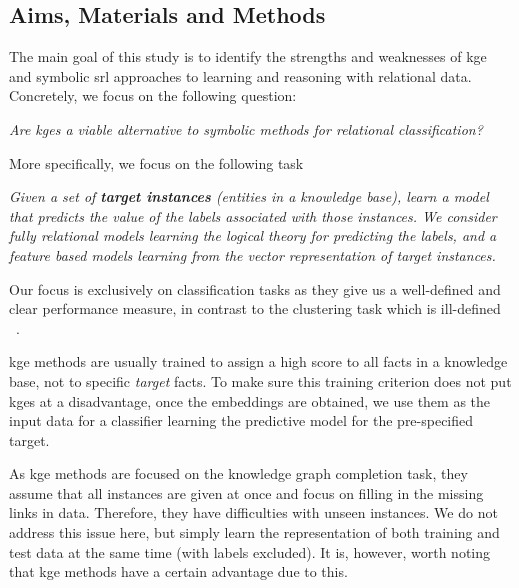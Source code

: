 \subsection{Aims, Materials and Methods}

The main goal of this study is to identify the strengths and weaknesses of  \gls{kge} and symbolic \gls{srl} approaches to learning and reasoning with relational data.
Concretely, we focus on the following question:

\begin{displayquote}
\textit{Are \gls{kge}s a viable alternative to symbolic methods for relational classification?}
\end{displayquote}


\noindent More specifically, we focus on the following task

\begin{displayquote}
\textit{Given a set of \textbf{target instances} (entities in a knowledge base), learn a model that predicts the value of the labels associated with those instances. We consider fully relational models learning the logical theory for predicting the labels, and a feature based models learning from the vector representation of target instances.}
\end{displayquote}


Our focus is exclusively on classification tasks as they give us a well-defined and clear performance measure, in contrast to the clustering task which is ill-defined ~\cite{Estivill-Castro:2002}.






\gls{kge} methods are usually trained to assign a high score to all facts in a knowledge base, not to specific \textit{target} facts.
To make sure this training criterion does not put \gls{kge}s at a disadvantage, once the embeddings are obtained, we use them as the input data for a classifier learning the predictive model for the pre-specified target.



As \gls{kge} methods are focused on the knowledge graph completion task, they assume that all instances are given at once and focus on filling in the missing links in data.
Therefore, they have difficulties with unseen instances.
We do not address this issue here, but simply learn the representation of both training and test data at the same time (with labels excluded).
It is, however, worth noting that \gls{kge} methods have a certain advantage due to this.




